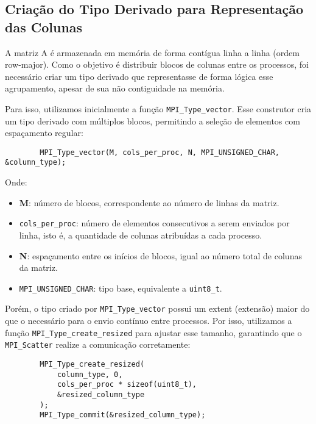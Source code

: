 \documentclass[a4paper, 12pt]{article}
\begin{document}
	\subsection{Criação do Tipo Derivado para Representação das Colunas}
	\hspace{0.62cm}A matriz A é armazenada em memória de forma contígua linha a linha (ordem row-major). Como o objetivo é distribuir blocos de colunas entre os processos, foi necessário criar um tipo derivado que representasse de forma lógica esse agrupamento, apesar de sua não contiguidade na memória.
	
	Para isso, utilizamos inicialmente a função \texttt{MPI\_Type\_vector}. Esse construtor cria um tipo derivado com múltiplos blocos, permitindo a seleção de elementos com espaçamento regular:
	
	\begin{verbatim}
		MPI_Type_vector(M, cols_per_proc, N, MPI_UNSIGNED_CHAR, &column_type);
	\end{verbatim}
	
	Onde:
	\begin{itemize}
		\item \textbf{M}: número de blocos, correspondente ao número de linhas da matriz.
		
		\item \texttt{cols\_per\_proc}: número de elementos consecutivos a serem enviados por linha, isto é, a quantidade de colunas atribuídas a cada processo.
		
		\item \textbf{N}: espaçamento entre os inícios de blocos, igual ao número total de colunas da matriz.
		
		\item \texttt{MPI\_UNSIGNED\_CHAR}: tipo base, equivalente a \texttt{uint8\_t}.
	\end{itemize}
	
	Porém, o tipo criado por \texttt{MPI\_Type\_vector} possui um extent (extensão) maior do que o necessário para o envio contínuo entre processos. Por isso, utilizamos a função \texttt{MPI\_Type\_create\_resized} para ajustar esse tamanho, garantindo que o \texttt{MPI\_Scatter} realize a comunicação corretamente:
	
	\begin{verbatim}
		MPI_Type_create_resized(
		    column_type, 0, 
		    cols_per_proc * sizeof(uint8_t),
		    &resized_column_type
		);
		MPI_Type_commit(&resized_column_type);	
	\end{verbatim}
	
\end{document}
